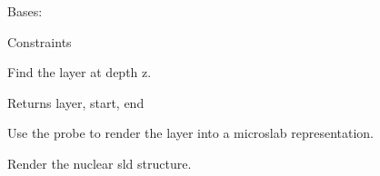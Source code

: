 \documentclass[letterpaper,10pt,english]{sphinxmanual}
\begin{document}
\begin{fulllineitems}
\label{api/magnetic:refl1d.magnetic.MagneticLayer}
Bases: {\hyperref[api/model:refl1d.model.Layer]{}}

\begin{fulllineitems}
\label{api/magnetic:refl1d.magnetic.MagneticLayer.constraints}
Constraints

\end{fulllineitems}


\begin{fulllineitems}
\label{api/magnetic:refl1d.magnetic.MagneticLayer.find}
Find the layer at depth z.

Returns layer, start, end

\end{fulllineitems}


\begin{fulllineitems}
\label{api/magnetic:refl1d.magnetic.MagneticLayer.parameters}
\end{fulllineitems}


\begin{fulllineitems}
\label{api/magnetic:refl1d.magnetic.MagneticLayer.render}
Use the probe to render the layer into a microslab representation.

\end{fulllineitems}


\begin{fulllineitems}
\label{api/magnetic:refl1d.magnetic.MagneticLayer.render_stack}
Render the nuclear sld structure.


\end{fulllineitems}
\end{fulllineitems}
\end{document}
